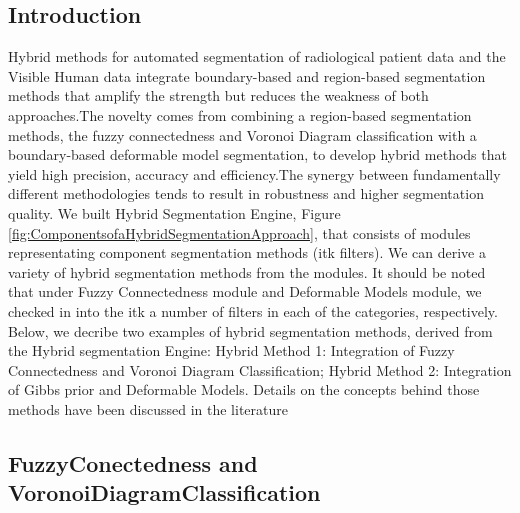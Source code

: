 %
%
% 
%
%
%

\subsection{Introduction}
\label{sec:HybridSegmentationIntroduction}


Hybrid methods for automated segmentation of radiological patient data and the 
Visible Human data integrate boundary-based and region-based segmentation methods 
that amplify the strength but reduces the weakness of both approaches.The novelty 
comes from combining a region-based segmentation methods, the fuzzy connectedness 
and Voronoi Diagram classification with a boundary-based deformable model 
segmentation, to develop hybrid methods that yield high precision, accuracy and 
efficiency.The synergy between fundamentally different methodologies tends to 
result in robustness and higher segmentation quality. We built Hybrid Segmentation 
Engine,  Figure \ref{fig:ComponentsofaHybridSegmentationApproach}, that consists of modules 
representating component segmentation methods (itk filters). We can derive a variety 
of hybrid segmentation methods from the modules. It should be noted that under Fuzzy 
Connectedness module and Deformable Models module, we checked in into the itk a number 
of filters in each of the categories, respectively. Below, we decribe two examples of
hybrid segmentation methods, derived from the Hybrid segmentation Engine: Hybrid 
Method 1: Integration of Fuzzy Connectedness and Voronoi Diagram Classification;
Hybrid Method 2: Integration of Gibbs prior and Deformable Models.
Details on the concepts behind those methods have been discussed in the
literature
\cite{Angelini2002,Udupa2002,Jin2002,Imielinska2001,Imielinska2000a,Imielinska2000b}



\subsection{FuzzyConectedness and VoronoiDiagramClassification}
\label{sec:HybridMethod1}

